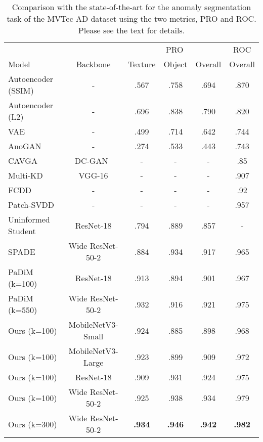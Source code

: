 \begin{table*}
  \centering
  \caption{Comparison with the state-of-the-art for the anomaly segmentation task of the MVTec AD dataset using the two metrics, PRO and ROC. Please see the text for details.}
  \label{tbl:mvtecad_pro}
  \begin{tabular}{lccccc}
  \toprule
        &          & \multicolumn{3}{c}{PRO} & ROC   \\
  \cmidrule(lr){3-5} \cmidrule(lr){6-6}
  Model & Backbone & Texture & Object & Overall & Overall \\ \midrule
  Autoencoder (SSIM)~\cite{Bergmann2019} & - & .567 & .758 & .694 & .870 \\
  Autoencoder (L2)~\cite{Bergmann2019}   & - & .696 & .838 & .790 & .820 \\
  VAE~\cite{Defard2020}                  & - & .499 & .714 & .642 & .744  \\
  AnoGAN~\cite{Schlegl2017}              & - & .274 & .533 & .443 & .743  \\ 
  CAVGA~\cite{Venkataramanan2020}        & DC-GAN~\cite{radford2016dcgan} & - & - & - & .85\0  \\ \midrule
  Multi-KD~\cite{Salehi2021}             & VGG-16           & -    & -    & -    & .907 \\
  FCDD~\cite{Liznerski2021}              & -                & -    & -    & -    & .92\0 \\
  Patch-SVDD~\cite{Yi2020}               & -                & -    & -    & -    & .957 \\
  Uninformed Student~\cite{Bergmann2020} & ResNet-18        & .794 & .889 & .857 & -    \\
  SPADE~\cite{Cohen2020}                 & Wide ResNet-50-2 & .884 & .934 & .917 & .965 \\
  PaDiM (k=100)~\cite{Defard2020}          & ResNet-18        & .913 & .894 & .901 & .967 \\
  PaDiM (k=550)~\cite{Defard2020}          & Wide ResNet-50-2 & .932 & .916 & .921 & .975 \\ \midrule
  Ours (k=100) & MobileNetV3-Small& .924      & .885      & .898      & .968 \\
  Ours (k=100) & MobileNetV3-Large& .923      & .899      & .909      & .972 \\
  Ours (k=100) & ResNet-18        & .909      & .931      & .924      & .975 \\
  Ours (k=100) & Wide ResNet-50-2 & .925      & .938      & .934      & .979 \\
  Ours (k=300) & Wide ResNet-50-2 & \bf{.934} & \bf{.946} & \bf{.942} & \bf{.982} \\
  \bottomrule
  \end{tabular}
\end{table*} 
